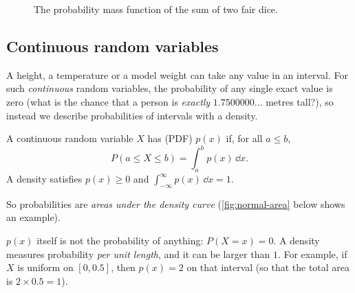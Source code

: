 \begin{figure}[htbp]
\centering
{}
\caption{The probability mass function of the sum of two fair dice.}
\label{fig:dice-pmf}
\end{figure}

\subsection{Continuous random variables}

A height, a temperature or a model weight can take any value in an interval. For
such \emph{continuous} random variables, the probability of any single exact
value is zero (what is the chance that a person is \emph{exactly}
$1.7500000\ldots$ metres tall?), so instead we describe probabilities of
intervals with a density.

\begin{definition}\label{def:pdf}
A continuous random variable $X$ has  (PDF)
$p(x)$ if, for all $a \le b$,
\[
  P(a \le X \le b) = \int_a^b p(x)\,\dd x .
\]
A density satisfies $p(x) \ge 0$ and $\int_{-\infty}^{\infty}p(x)\,\dd x = 1$.
\end{definition}

So probabilities are \emph{areas under the density curve}
(\cref{fig:normal-area} below shows an example).

\begin{pitfall}
$p(x)$ itself is not the probability of anything: $P(X = x) = 0$. A density
measures probability \emph{per unit length}, and it can be larger than $1$. For
example, if $X$ is uniform on $[0, 0.5]$, then $p(x) = 2$ on that interval
(so that the total area is $2 \times 0.5 = 1$).
\end{pitfall}

